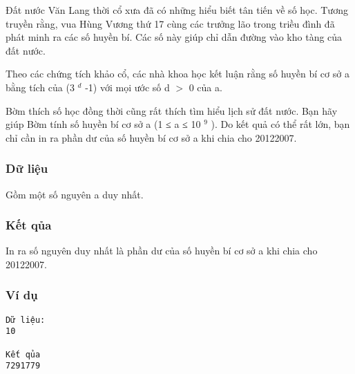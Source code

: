 



   Đất nước Văn Lang thời cổ xưa đã có những hiểu biết tân tiến về số học. Tương truyền rằng, vua Hùng Vương thứ 17 cùng các trưởng lão   trong triều đình đã phát minh ra các số huyền bí. Các số này giúp chỉ dẫn đường vào kho tàng của đất nước.  

   Theo các chứng tích khảo cổ, các nhà khoa học kết luận rằng số huyền bí cơ sở a bằng tích của (3   $^    d   $   -1) với mọi ước số d $>$ 0   của a.  

   Bờm thích số học đồng thời cũng rất thích tìm hiểu lịch sử đất nước. Bạn hãy giúp Bờm tính số huyền bí cơ sở a (1 ≤ a ≤ 10   $^    9   $   ).   Do kết quả có thể rất lớn, bạn chỉ cần in ra phần dư của số huyền bí cơ sở a khi chia cho 20122007.  

\subsubsection{   Dữ liệu  }

   Gồm một số nguyên a duy nhất.  

\subsubsection{   Kết qủa  }

   In ra số nguyên duy nhất là phần dư của số huyền bí cơ sở a khi chia cho 20122007.  

\subsubsection{   Ví dụ  }
\begin{verbatim}
Dữ liệu:
10

Kết qủa
7291779
\end{verbatim}